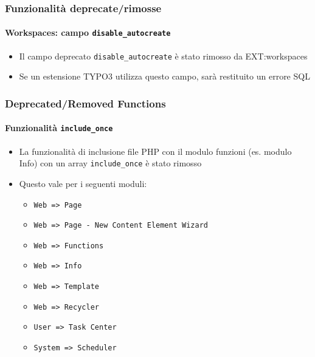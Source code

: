\begin{frame}[fragile]
	\frametitle{Funzionalità deprecate/rimosse}
	\framesubtitle{Workspaces: campo \texttt{disable\_autocreate}}

	\begin{itemize}
		\item Il campo deprecato \texttt{disable\_autocreate} è stato rimosso da EXT:workspaces
		\item Se un estensione TYPO3 utilizza questo campo, sarà restituito un errore SQL
	\end{itemize}

\end{frame}


\begin{frame}[fragile]
	\frametitle{Deprecated/Removed Functions}
	\framesubtitle{Funzionalità \texttt{include\_once}}

	\begin{itemize}

		\item La funzionalità di inclusione file PHP con il modulo funzioni (es. modulo Info)
			con un array \texttt{include\_once} è stato rimosso

		\item Questo vale per i seguenti moduli:

			\begin{itemize}
				\item \texttt{Web => Page}
				\item \texttt{Web => Page - New Content Element Wizard}
				\item \texttt{Web => Functions}
				\item \texttt{Web => Info}
				\item \texttt{Web => Template}
				\item \texttt{Web => Recycler}
				\item \texttt{User => Task Center}
				\item \texttt{System => Scheduler}
			\end{itemize}

	\end{itemize}

\end{frame}

